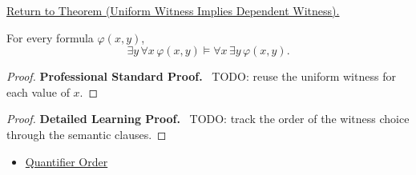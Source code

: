 \newpage
{}
\label{prf:uniform-witness-implies-dependent-witness}

\begin{remark*}[Return]
\hyperref[thm:uniform-witness-implies-dependent-witness]{Return to Theorem (Uniform Witness Implies Dependent Witness).}
\end{remark*}

\begin{theorem*}
For every formula \(\varphi(x,y)\),
\[
\exists y\,\forall x\,\varphi(x,y)\models\forall x\,\exists y\,\varphi(x,y).
\]
\end{theorem*}

\begin{proof}
\textbf{Professional Standard Proof.}~
TODO: reuse the uniform witness for each value of \(x\).
\end{proof}

\begin{proof}
\textbf{Detailed Learning Proof.}~
TODO: track the order of the witness choice through the semantic clauses.
\end{proof}

\begin{remark*}
\end{remark*}

\begin{dependencies}
\begin{itemize}
  \item \hyperref[def:q-alt]{Quantifier Order}
\end{itemize}
\end{dependencies}

\clearpage
